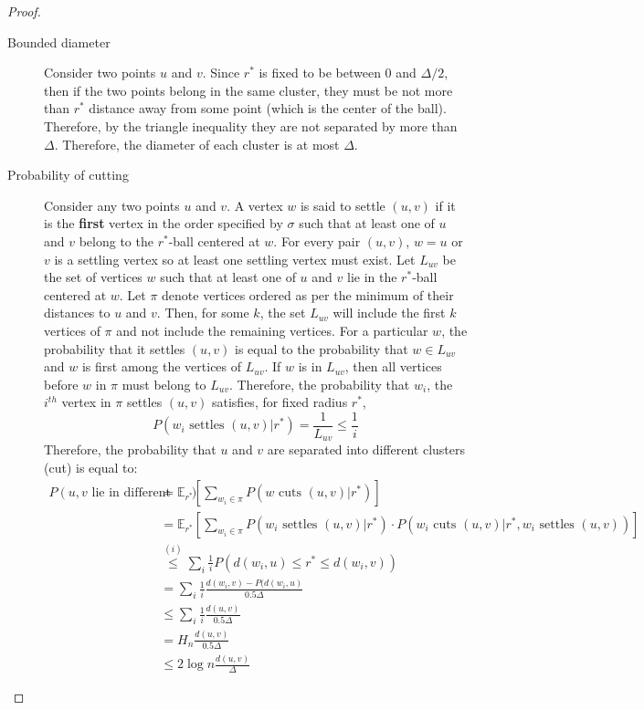 \begin{proof}
\begin{description}
	\item[Bounded diameter] Consider two points $u$ and $v$. Since $r^*$ is fixed to be between $0$ and $\Delta / 2$, then if the two points belong in the same cluster, they must be not more than $r^*$ distance away from some point (which is the center of the ball). Therefore, by the triangle inequality they are not separated by more than $\Delta$. Therefore, the diameter of each cluster is at most $\Delta$.
	\item[Probability of cutting] Consider any two points $u$ and $v$. A vertex $w$ is said to settle $(u,v)$ if it is the \textbf{first} vertex in the order specified by $\sigma$ such that at least one of $u$ and $v$ belong to the $r^*$-ball centered at $w$. For every pair $(u,v)$, $w = u$ or $v$ is a settling vertex so at least one settling vertex must exist.
	Let $L_{uv}$ be the set of vertices $w$ such that at least one of $u$ and $v$ lie in the $r^*$-ball centered at $w$. Let $\pi$ denote vertices ordered as per the minimum of their distances to $u$ and $v$. Then, for some $k$, the set $L_{uv}$ will include the first $k$ vertices of $\pi$ and not include the remaining vertices. For a particular $w$, the probability that it settles $(u,v)$ is equal to the probability that $w \in L_{uv}$ and $w$ is first among the vertices of $L_{uv}$. If $w$ is in $L_{uv}$, then all vertices before $w$ in $\pi$ must belong to $L_{uv}$. Therefore, the probability that $w_i$, the $i^{th}$ vertex in $\pi$ settles $(u,v)$ satisfies, for fixed radius $r^*$,
	\begin{equation*}
		P (w_i \text{ settles } (u,v) | r^*) = \frac{1}{L_{uv}} \le \frac{1}{i}
	\end{equation*}
	Therefore, the probability that $u$ and $v$ are separated into different clusters (cut) is equal to:
	\begin{align}
		P (u,v \text{ lie in different clusters}) &= \mathbb{E}_{r^*} \left[\sum_{w_i \in \pi} P (w \text{ cuts } (u,v) | r^*) \right] \\
		&= \mathbb{E}_{r^*} \left[\sum_{w_i \in \pi} P (w_i \text{ settles } (u,v) | r^*) \cdot P (w_i \text{ cuts } (u,v) | r^*, w_i \text{ settles } (u,v)) \right] \\
		&\overset{(i)}{\le} \sum_i \frac{1}{i} P( d(w_i,u) \le r^* \le d(w_i,v) ) \label{ineq:1}\\
		&= \sum_i \frac{1}{i} \frac{d(w_i,v) - P( d(w_i,u)}{0.5 \Delta} \\
		&\le \sum_i \frac{1}{i} \frac{d(u,v)}{0.5 \Delta} \\
		&= H_n  \frac{d(u,v)}{0.5 \Delta} \\
		&\le 2 \log{n} \frac{d(u,v)}{\Delta}
	\end{align}
\end{description}
\end{proof}

